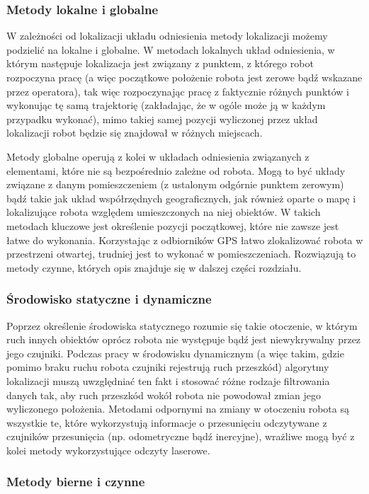 \subsubsection{Metody lokalne i globalne}

W zależności od lokalizacji układu odniesienia metody lokalizacji możemy
podzielić na lokalne i globalne. W metodach lokalnych układ odniesienia, w
którym następuje lokalizacja jest związany z punktem, z którego robot rozpoczyna
pracę (a więc początkowe położenie robota jest zerowe bądź wskazane przez
operatora), tak więc rozpoczynając pracę z faktycznie różnych punktów i
wykonując tę samą trajektorię (zakładając, że w ogóle może ją w każdym
przypadku wykonać), mimo takiej samej pozycji wyliczonej przez układ
lokalizacji robot będzie się znajdował w różnych miejscach.

Metody globalne operują z kolei w układach odniesienia związanych z elementami,
które nie są bezpośrednio zależne od robota. Mogą to być układy związane z danym
pomieszczeniem (z ustalonym odgórnie punktem zerowym) bądź takie jak układ
współrzędnych geograficznych, jak również oparte o mapę i lokalizujące robota
względem umieszczonych na niej obiektów. W takich metodach kluczowe jest
określenie pozycji początkowej, które nie zawsze jest łatwe do wykonania.
Korzystając z odbiorników GPS łatwo zlokalizować robota w przestrzeni otwartej,
trudniej jest to wykonać w pomieszczeniach. Rozwiązują to metody czynne, których
opis znajduje się w dalszej części rozdziału.

\subsubsection{Środowisko statyczne i  dynamiczne}

Poprzez określenie środowiska statycznego rozumie się takie otoczenie, w którym
ruch innych obiektów oprócz robota nie występuje bądź jest niewykrywalny przez
jego czujniki. Podczas pracy w środowisku dynamicznym (a więc takim, gdzie
pomimo braku ruchu robota czujniki rejestrują ruch przeszkód) algorytmy
lokalizacji muszą uwzględniać ten fakt i stosować różne rodzaje filtrowania
danych tak, aby ruch przeszkód wokół robota nie powodował zmian jego wyliczonego
położenia. Metodami odpornymi na zmiany w otoczeniu robota są wszystkie te,
które wykorzystują informacje o przesunięciu odczytywane z czujników
przesunięcia (np. odometryczne bądź inercyjne), wrażliwe mogą być z kolei metody
wykorzystujące odczyty laserowe.

\subsubsection{Metody bierne i czynne}

